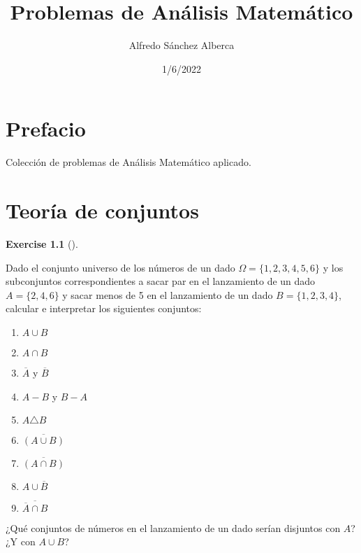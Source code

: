 \documentclass[
  letterpaper,
  DIV=11,
  numbers=noendperiod]{scrreport}
\title{Problemas de Análisis Matemático}
\author{Alfredo Sánchez Alberca}
\date{1/6/2022}
\providecommand{\tightlist}{%
  \setlength{\itemsep}{0pt}\setlength{\parskip}{0pt}}\usepackage{longtable,booktabs,array}
\renewcommand*\contentsname{Table of contents}
\newcommand\contentsname{Table of contents}
\theoremstyle{definition}
\newtheorem{exercise}{Exercise}[chapter]
\theoremstyle{remark}
\begin{document}
\maketitle
\ifdefined\Shaded\renewenvironment{Shaded}{\begin{tcolorbox}[sharp corners, frame hidden, enhanced, interior hidden, borderline west={3pt}{0pt}{shadecolor}, breakable, boxrule=0pt]}{\end{tcolorbox}}\fi

\renewcommand*\contentsname{Table of contents}
{
\hypersetup{linkcolor=}
\setcounter{tocdepth}{2}
\tableofcontents
}

\hypertarget{prefacio}{%
\chapter*{Prefacio}\label{prefacio}}

Colección de problemas de Análisis Matemático aplicado.


\hypertarget{teoruxeda-de-conjuntos}{%
\chapter{Teoría de conjuntos}\label{teoruxeda-de-conjuntos}}

\leavevmode{}%
\begin{exercise}[]\label{exr-1}

Dado el conjunto universo de los números de un dado
\(\Omega=\{1, 2, 3, 4, 5, 6\}\) y los subconjuntos correspondientes a
sacar par en el lanzamiento de un dado \(A=\{2, 4, 6\}\) y sacar menos
de 5 en el lanzamiento de un dado \(B=\{1, 2, 3, 4\}\), calcular e
interpretar los siguientes conjuntos:

\begin{enumerate}
\def\labelenumi{\alph{enumi}.}
\tightlist
\item
  \(A\cup B\)
\item
  \(A\cap B\)
\item
  \(\overline A\) y \(\overline B\)
\item
  \(A-B\) y \(B-A\)
\item
  \(A\triangle B\)
\item
  \(\overline{(A\cup B)}\)
\item
  \(\overline{(A\cap B)}\)
\item
  \(A\cup \overline B\)
\item
  \(\overline{\overline A \cap B}\)
\end{enumerate}

¿Qué conjuntos de números en el lanzamiento de un dado serían disjuntos
con \(A\)? ¿Y con \(A\cup B\)?

\end{exercise}
\end{document}
